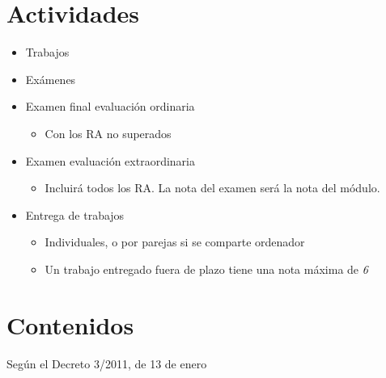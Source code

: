 \documentclass[a4paper]{article}
\begin{document}
\section{Actividades}
\label{sec:org0000012}
\begin{itemize}
\item Trabajos
\item Exámenes
\item Examen final evaluación ordinaria
\begin{itemize}
\item Con los RA no superados
\end{itemize}
\item Examen evaluación extraordinaria
\begin{itemize}
\item Incluirá todos los RA. La nota del examen será la nota del módulo.
\end{itemize}
\item Entrega de trabajos
\begin{itemize}
\item Individuales, o por parejas si se comparte ordenador
\item Un trabajo entregado fuera de plazo tiene una nota máxima de \emph{6}
\end{itemize}
\end{itemize}
\section{Contenidos}
\label{sec:org0000015}

Según el Decreto 3/2011, de 13 de enero
\end{document}
